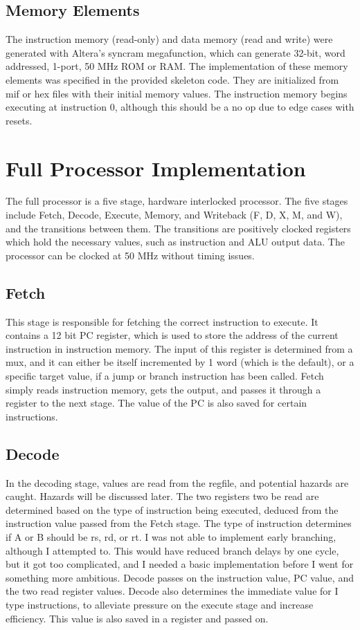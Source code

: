 \documentclass[letterpaper]{article} %
\begin{document}
\subsection*{Memory Elements}
The instruction memory (read-only) and data memory (read and write) were generated with Altera's syncram megafunction, which can generate 32-bit, word addressed, 1-port, 50 MHz ROM or RAM. The implementation of these memory elements was specified in the provided skeleton code. They are initialized from mif or hex files with their initial memory values. The instruction memory begins executing at instruction 0, although this should be a no op due to edge cases with resets. 

\section*{Full Processor Implementation}
The full processor is a five stage, hardware interlocked processor. The five stages include Fetch, Decode, Execute, Memory, and Writeback (F, D, X, M, and W), and the transitions between them. The transitions are positively clocked registers which hold the necessary values, such as instruction and ALU output data. The processor can be clocked at 50 MHz without timing issues.\\

\subsection*{Fetch}
This stage is responsible for fetching the correct instruction to execute. It contains a 12 bit PC register, which is used to store the address of the current instruction in instruction memory. The input of this register is determined from a mux, and it can either be itself incremented by 1 word (which is the default), or a specific target value, if a jump or branch instruction has been called. Fetch simply reads instruction memory, gets the output, and passes it through a register to the next stage. The value of the PC is also saved for certain instructions. \\

\subsection*{Decode}
In the decoding stage, values are read from the regfile, and potential hazards are caught. Hazards will be discussed later. The two registers two be read are determined based on the type of instruction being executed, deduced from the instruction value passed from the Fetch stage. The type of instruction determines if A or B should be rs, rd, or rt. I was not able to implement early branching, although I attempted to. This would have reduced branch delays by one cycle, but it got too complicated, and I needed a basic implementation before I went for something more ambitious. Decode passes on the instruction value, PC value, and the two read register values. Decode also determines the immediate value for I type instructions, to alleviate pressure on the execute stage and increase efficiency. This value is also saved in a register and passed on. \\
\end{document}

